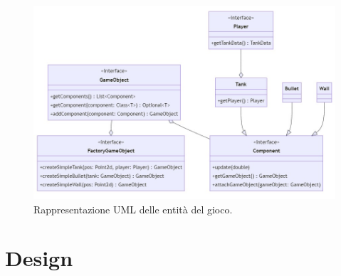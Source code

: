 \documentclass[a4paper,12pt]{report}
\begin{document}
\begin{figure}[H]
    \centering{}
	\includegraphics[scale=0.5]{img/model.jpg}
	\caption{Rappresentazione UML delle entità del gioco.}
	\end{figure}

%
\chapter{Design}
\end{document}
